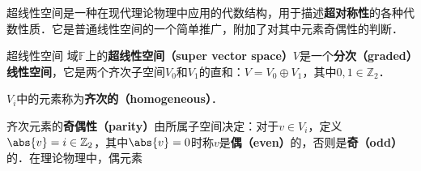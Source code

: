 

超线性空间是一种在现代理论物理中应用的代数结构，用于描述\textbf{超对称性}的各种代数性质．它是普通线性空间的一个简单推广，附加了对其中元素奇偶性的判断．

\begin{definition}{超线性空间}
域$\mathbb{F}$上的\textbf{超线性空间（super vector space）}$V$是一个\textbf{分次（graded）线性空间}，它是两个齐次子空间$V_0$和$V_1$的直和：$V=V_0\oplus V_1$，其中$0, 1\in \mathbb{Z}_2$．
\end{definition}


$V_i$中的元素称为\textbf{齐次的（homogeneous）}．

齐次元素的\textbf{奇偶性（parity）}由所属子空间决定：对于$v\in V_i$，定义$\abs{v}=i\in\mathbb{Z}_2$，其中$\abs{v}=0$时称$v$是\textbf{偶（even）}的，否则是\textbf{奇（odd）}的．在理论物理中，偶元素














